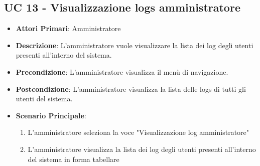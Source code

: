 		\subsection{UC 13 - Visualizzazione logs amministratore}
		\begin{itemize}
			\item \textbf{Attori Primari}: Amministratore
			\item \textbf{Descrizione}: L'amministratore vuole visualizzare la lista dei log degli utenti presenti all'interno del sistema.
			\item \textbf{Precondizione}: L'amministratore visualizza il menù di navigazione.
			\item \textbf{Postcondizione}: L'amministratore visualizza la lista delle logs di tutti gli utenti del sistema.
			\item \textbf{Scenario Principale}:
			\begin{enumerate}
				\item{L'amministratore seleziona la voce "Visualizzazione log amministratore"}
				\item{L'amministratore visualizza la lista dei log degli utenti presenti all'interno del sistema in forma tabellare}
			\end{enumerate}	
		\end{itemize}
		


		




